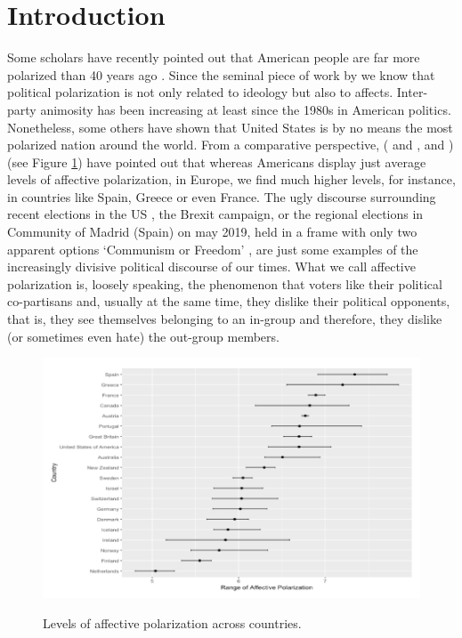 \documentclass[a4paper, svgnames]{article}
\begin{document}
\newpage
\listoffigures

\newpage %
\thispagestyle{empty}
\mbox{}


\listoftables

\newpage %
\thispagestyle{empty}
\mbox{}

\clearpage
{}

\section{Introduction}

Some scholars have recently pointed out that American people are far more polarized than 40 years ago \citep{Lelkes2018}. Since the seminal piece of work by \cite{Iyengar2012} we know that political polarization is not only related to ideology but also to affects. Inter-party animosity has been increasing at least since the 1980s in American politics. Nonetheless, some others have shown that United States is by no means the most polarized nation around the world. From a comparative perspective, (\citeauthor{Gidron2018} \citeyear{Gidron2018} and \citeyear{Gidron2019}, and \cite{WESTWOOD2018}) (see Figure \ref{fig:af-pol-comp}) have pointed out that whereas Americans display just average levels of affective polarization, in Europe, we find much higher levels, for instance, in countries like Spain, Greece or even France. The ugly discourse surrounding recent elections in the US \citep*{AmericaUglyElection}, the Brexit campaign, or the regional elections in Community of Madrid (Spain) on may 2019, held in a frame with only two apparent options `Communism or Freedom' \citep*{elconfindencialComunismoLibertadIsabel2021}, are just some examples of the increasingly divisive political discourse of our times. What we call affective polarization is, loosely speaking, the phenomenon that voters like their political co-partisans and, usually at the same time, they dislike their political opponents, that is, they see themselves belonging to an in-group and therefore, they dislike (or sometimes even hate) the out-group members.

\begin{figure}[H]
	\centering
	\caption{Levels of affective polarization across countries.}
	\includegraphics[scale=.7]{figure1.png}
	\label{fig:af-pol-comp}
\end{figure}
\end{document}
